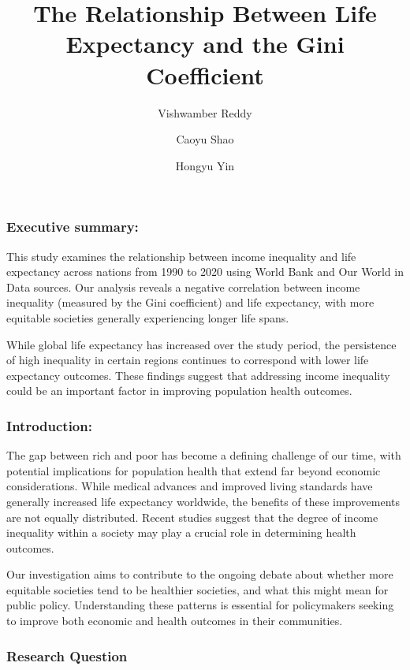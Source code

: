 \documentclass[
  11pt,
]{article}
\title{The Relationship Between Life Expectancy and the Gini
Coefficient}
\author{Vishwamber Reddy \and Caoyu Shao \and Hongyu Yin}
\date{}
\renewcommand*\contentsname{Table of contents}
\newcommand\contentsname{Table of contents}
\begin{document}
\maketitle

\renewcommand*\contentsname{Table of contents}
{
\hypersetup{linkcolor=}
\setcounter{tocdepth}{3}
\tableofcontents
}

\subsubsection{Executive summary:}\label{executive-summary}

This study examines the relationship between income inequality and life
expectancy across nations from 1990 to 2020 using World Bank and Our
World in Data sources. Our analysis reveals a negative correlation
between income inequality (measured by the Gini coefficient) and life
expectancy, with more equitable societies generally experiencing longer
life spans.

While global life expectancy has increased over the study period, the
persistence of high inequality in certain regions continues to
correspond with lower life expectancy outcomes. These findings suggest
that addressing income inequality could be an important factor in
improving population health outcomes.

\subsubsection{Introduction:}\label{introduction}

The gap between rich and poor has become a defining challenge of our
time, with potential implications for population health that extend far
beyond economic considerations. While medical advances and improved
living standards have generally increased life expectancy worldwide, the
benefits of these improvements are not equally distributed. Recent
studies suggest that the degree of income inequality within a society
may play a crucial role in determining health outcomes.

Our investigation aims to contribute to the ongoing debate about whether
more equitable societies tend to be healthier societies, and what this
might mean for public policy. Understanding these patterns is essential
for policymakers seeking to improve both economic and health outcomes in
their communities.

\subsubsection{Research Question}\label{research-question}
\end{document}
